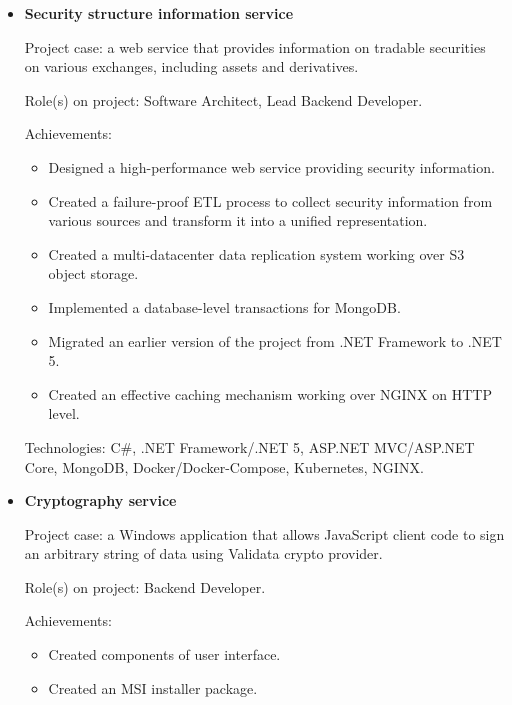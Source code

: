 \documentclass{article}
\begin{document}
\begin{itemize}
{        Technologies: C\#, .NET 5, ASP.NET Core, MongoDB, RabbitMQ, Blazor Server, WebSocket, Docker/Docker-Compose, Kubernetes.
    }
    \item {
        \textbf{Security structure information service}
        
        Project case: a web service that provides information on tradable securities on various exchanges, including assets and derivatives.
        
        Role(s) on project: Software Architect, Lead Backend Developer.
        
        Achievements:
        
            \begin{itemize}
                \item Designed a high-performance web service providing security information.
                \item Created a failure-proof ETL process to collect security information from various sources and transform it into a unified representation. 
                \item Created a multi-datacenter data replication system working over S3 object storage.
                \item Implemented a database-level transactions for MongoDB.
                \item Migrated an earlier version of the project from .NET Framework to .NET 5.
                \item Created an effective caching mechanism working over NGINX on HTTP level.
            \end{itemize}
        
        Technologies: C\#, .NET Framework/.NET 5, ASP.NET MVC/ASP.NET Core, MongoDB,  Docker/Docker-Compose, Kubernetes, NGINX.
    }
    \item {
        \textbf{Cryptography service}
        
        Project case: a Windows application that allows JavaScript client code to sign an arbitrary string of data using Validata crypto provider.
        
        Role(s) on project: Backend Developer.
        
        Achievements:
        
            \begin{itemize}
                \item Created components of user interface.
                \item Created an MSI installer package.
            \end{itemize}
        
}
\end{itemize}
\end{document}

